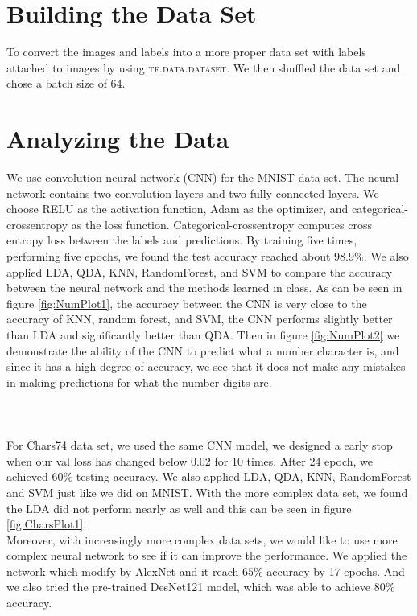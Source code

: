 \documentclass{article}
\begin{document}
\begin{multicols}{2}
\section*{Building the Data Set}
To convert the images and labels into a more proper data set with labels attached to images by using \textsc{tf.data.dataset}. We then shuffled the data set and chose a batch size of 64.



\section*{Analyzing the Data}
We use convolution neural network (CNN) for the MNIST data set. The neural network contains two convolution layers and two fully connected layers. We choose RELU as the activation function, Adam as the optimizer, and categorical-crossentropy as the loss function. Categorical-crossentropy computes cross entropy loss between the labels and predictions. By training five times, performing five epochs, we found the test accuracy reached about $98.9\%$. We also applied LDA, QDA, KNN, RandomForest, and SVM to compare the accuracy between the neural network and the methods learned in class. As can be seen in figure \ref{fig:NumPlot1}, the accuracy between the CNN is very close to the accuracy of KNN, random forest, and SVM, the CNN performs slightly better than LDA and significantly better than QDA. Then in figure \ref{fig:NumPlot2} we demonstrate the ability of the CNN to predict what a number character is, and since it has a high degree of accuracy, we see that it does not make any mistakes in making predictions for what the number digits are.\\\\\\\\
For Chars74 data set, we used the same CNN model, we designed a early stop when our val loss has changed below 0.02 for 10 times. After 24 epoch, we achieved $60\%$ testing accuracy. We also applied LDA, QDA, KNN, RandomForest and SVM just like we did on MNIST. With the more complex data set, we found the LDA did not perform nearly as well and this can be seen in figure \ref{fig:CharsPlot1}.\\

Moreover, with increasingly more complex data sets, we would like to use more complex neural network to see if it can improve the performance. We applied the network which modify by AlexNet and it reach $65\%$ accuracy by 17 epochs. And we also tried the pre-trained DesNet121 model, which was able to achieve $80\%$ accuracy.\\
\end{multicols}
\end{document}
